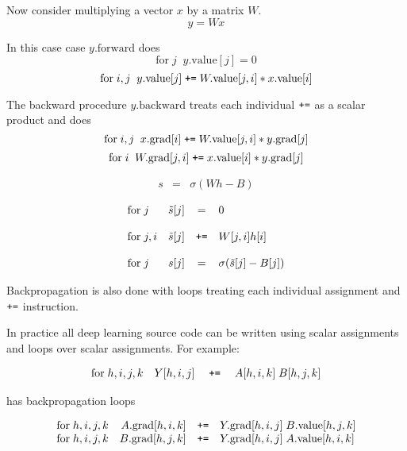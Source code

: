 {
Now consider multiplying a vector $x$ by a matrix $W$.
$$y = Wx$$

\vfill
In this case case $y.\mathrm{forward}$ does
$$\mathrm{for}\;j\;\;y.\mathrm{value}[j] = 0$$
$$\mathrm{for}\;i,j\;\;y.\mathrm{value}[j] \;\mbox{\tt +=}\;W.\mathrm{value}[j,i]*x.\mathrm{value}[i]$$

\vfill
The backward procedure $y.\mathrm{backward}$ treats each individual $\mbox{\tt +=}$ as a scalar product and does
$$\mathrm{for}\;i,j\;\;x.\mathrm{grad}[i] \;\mbox{\tt +=}\;W.\mathrm{value}[j,i]*y.\mathrm{grad}[j]$$
$$\mathrm{for}\;i\;\;W.\mathrm{grad}[j,i] \;\mbox{\tt +=}\;x.\mathrm{value}[i]*y.\mathrm{grad}[j]$$


\begin{eqnarray*}
   s & = & \sigma\left(Wh - B \right)
\end{eqnarray*}

$$\begin{array}{lrcl}
\mathrm{for}\;j &  \tilde{s}[j] & = & 0 \\
\\
\mathrm{for}\;j,i &  \tilde{s}[j] & \mbox{\tt +=} &  W[j,i]h[i] \\
\\
\mathrm{for}\; j & s[j] & = & \sigma(\tilde{s}[j] - B[j])
\end{array}$$

\vfill
Backpropagation is also done with loops treating each individual assignment and $\mbox{\tt +=}$ instruction.


In practice all deep learning source code can be written using scalar assignments and loops over scalar assignments.
For example:

$$\begin{array}{rrcl}
\mathrm{for}\; h,i,j,k & Y[h,i,j] & \;\mbox{\tt +=}\; & A[h,i,k]\;B[h,j,k] \\
\end{array}$$

\vfill
has backpropagation loops

$$\begin{array}{rrcl}
\mathrm{for}\;h,i,j,k & A.\mathrm{grad}[h,i,k] & \mbox{\tt +=} & Y.\mathrm{grad}[h,i,j] \;B.\mathrm{value}[h,j,k] \\
\mathrm{for}\;h,i,j,k & B.\mathrm{grad}[h,j,k] & \mbox{\tt +=} & Y.\mathrm{grad}[h,i,j]\;A.\mathrm{value}[h,i,k]
\end{array}$$

}


